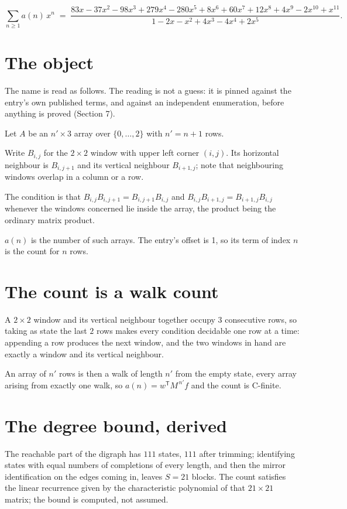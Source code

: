 \documentclass[11pt]{article}
\theoremstyle{definition}
\begin{document}
\[\sum_{n \ge 1} a(n)\,x^n \;=\; \frac{83x - 37x^{2} - 98x^{3} + 279x^{4} - 280x^{5} + 8x^{6} + 60x^{7} + 12x^{8} + 4x^{9} - 2x^{10} + x^{11}}{1 - 2x - x^{2} + 4x^{3} - 4x^{4} + 2x^{5}}.\]

\section{The object}

The name is read as follows. The reading is not a guess: it is pinned against the entry's own published terms, and against an independent enumeration, before anything is proved (Section 7).

Let $A$ be an $n' \times 3$ array over $\{0,\dots,2\}$ with $n' = n + 1$ rows.

Write $B_{i,j}$ for the $2\times2$ window with upper left corner $(i,j)$. Its horizontal neighbour is $B_{i,j+1}$ and its vertical neighbour $B_{i+1,j}$; note that neighbouring windows overlap in a column or a row.

The condition is that $B_{i,j}B_{i,j+1} = B_{i,j+1}B_{i,j}$ and $B_{i,j}B_{i+1,j} = B_{i+1,j}B_{i,j}$ whenever the windows concerned lie inside the array, the product being the ordinary matrix product.

$a(n)$ is the number of such arrays. The entry's offset is 1, so its term of index $n$ is the count for $n$ rows.

\section{The count is a walk count}

A $2\times2$ window and its vertical neighbour together occupy $3$ consecutive rows, so taking as state the last $2$ rows makes every condition decidable one row at a time: appending a row produces the next window, and the two windows in hand are exactly a window and its vertical neighbour.

An array of $n'$ rows is then a walk of length $n'$ from the empty state, every array arising from exactly one walk, so $a(n) = w^{\mathsf T}M^{\,n'}f$ and the count is C-finite.

\section{The degree bound, derived}

The reachable part of the digraph has $111$ states, $111$ after trimming; identifying states with equal numbers of completions of every length, and then the mirror identification on the edges coming in, leaves $S = 21$ blocks. The count satisfies the linear recurrence given by the characteristic polynomial of that $21\times21$ matrix; the bound is computed, not assumed.
\end{document}
